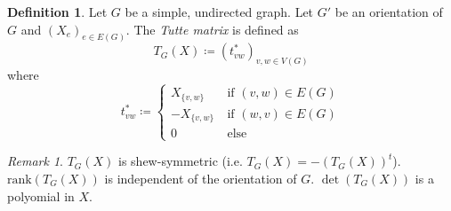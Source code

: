 \documentclass[11pt, a4paper]{article}
\theoremstyle{remark}
\newtheorem{remark}[theorem]{Remark}
\theoremstyle{definition}
\newtheorem{definition}[theorem]{Definition}
\begin{document}
\begin{definition}
	Let $G$ be a simple, undirected graph. Let $G'$ be an orientation
	of $G$ and $(X_e)_{e\in E(G)}$. The \emph{Tutte matrix} is defined as
	\[T_G(X)\coloneqq (t^*_{vw})_{v,w\in V(G)}\]
	where
	\[
		t^*_{vw}\coloneqq \begin{cases}
			X_{\{v,w\}} \quad & \text{if $(v,w)\in E(G)$}  \\
			-X_{\{v,w\}}      & \text{if $(w,v)\in E(G)$} \\
			0                 & \text{else}
		\end{cases}
	\]
\end{definition}

\begin{remark}
	$T_G(X)$ is shew-symmetric (i.e. $T_G(X)=-(T_G(X))^t$).
	$\mathrm{rank}(T_G(X))$ is independent of the orientation of $G$.
	$\det(T_G(X))$ is a polyomial in $X$.
\end{remark}
\end{document}
